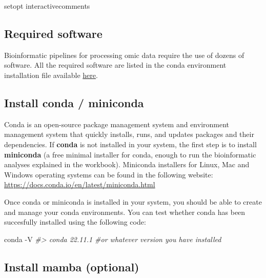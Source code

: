 \documentclass[
]{book}
\newenvironment{Shaded}{\begin{snugshade}}{\end{snugshade}}
\newcommand{\AttributeTok}[1]{\textcolor[rgb]{0.77,0.63,0.00}{#1}}
\newcommand{\CommentTok}[1]{\textcolor[rgb]{0.56,0.35,0.01}{\textit{#1}}}
\newcommand{\ExtensionTok}[1]{#1}
\newcommand{\NormalTok}[1]{#1}
\begin{document}
\begin{Shaded}
\begin{Highlighting}[]
\ExtensionTok{setopt}\NormalTok{ interactivecomments}
\end{Highlighting}
\end{Shaded}

\hypertarget{required-software}{%
\subsection*{Required software}\label{required-software}}

Bioinformatic pipelines for processing omic data require the use of dozens of software. All the required software are listed in the conda environment installation file available \href{https://raw.githubusercontent.com/holo-omics/holo-omics.github.io/main/bin/holo-omics-env.yaml}{here}.

\hypertarget{install-conda-miniconda}{%
\subsection*{Install conda / miniconda}\label{install-conda-miniconda}}

Conda is an open-source package management system and environment management system that quickly installs, runs, and updates packages and their dependencies. If \textbf{conda} is not installed in your system, the first step is to install \textbf{miniconda} (a free minimal installer for conda, enough to run the bioinformatic analyses explained in the workbook). Miniconda installers for Linux, Mac and Windows operating systems can be found in the following website:
\url{https://docs.conda.io/en/latest/miniconda.html}

Once conda or miniconda is installed in your system, you should be able to create and manage your conda environments. You can test whether conda has been succesfully installed using the following code:

\begin{Shaded}
\begin{Highlighting}[]
\ExtensionTok{conda} \AttributeTok{{-}V}
\CommentTok{\#\textgreater{} conda 22.11.1 \#or whatever version you have installed}
\end{Highlighting}
\end{Shaded}

\hypertarget{install-mamba}{%
\subsection*{Install mamba (optional)}\label{install-mamba}}
\end{document}
